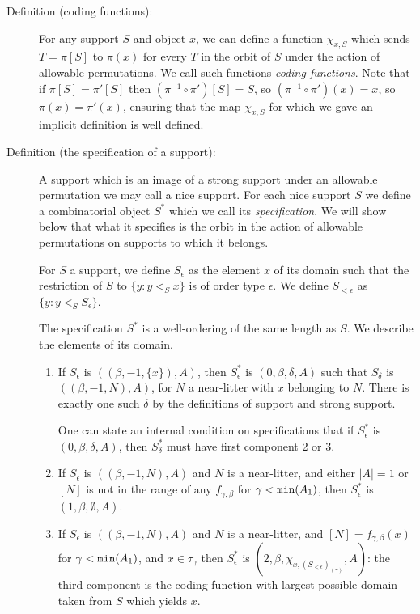 \documentclass[112pt]{article}
\begin{document}
\begin{description}

\item[Definition (coding functions):]  For any support $S$ and object $x$, we can define a function $\chi_{x,S}$ which sends $T=\pi[S]$ to $\pi(x)$ for every $T$ in the orbit of $S$ under
the action of allowable permutations.  We call such functions {\em coding functions\/}.  Note that if $\pi[S]=\pi'[S]$ then $(\pi^{-1}\circ \pi')[S]= S$, so 
$(\pi^{-1}\circ \pi')(x)= x$, so $\pi(x)=\pi'(x)$, ensuring that the map $\chi_{x,S}$ for which we gave an implicit definition is well defined.

\item[Definition (the specification of a support):]  A support which is an image of a strong support under an allowable permutation we may call a nice support.  For each nice support $S$ we define a combinatorial object $S^*$ which we call its {\em specification\/}.  We will show below that what it specifies is the orbit in the action of allowable permutations on supports to which it belongs.

For $S$ a support, we define $S_\epsilon$ as the element $x$ of its domain such that the restriction of $S$ to $\{y:y <_S x\}$ is of order type $\epsilon$.  We define
$S_{<\epsilon}$ as $\{y:y <_S S_\epsilon\}$.

The specification $S^*$ is a well-ordering of the same length as $S$.  We describe the elements of its domain.

\begin{enumerate}

\item  If $S_{\epsilon}$ is $((\beta,-1,\{x\}),A)$, then $S^*_\epsilon$ is $(0,\beta,\delta,A)$ such that $S_\delta$ is $((\beta,-1,N),A)$, for $N$ a near-litter with $x$ belonging to $N$.  There is exactly one such $\delta$ by the definitions of support and strong support.

One can state an internal condition on specifications that if $S^*_\epsilon$ is $(0,\beta,\delta,A)$, then $S^*_\delta$ must have first component 2 or 3.

\item  If $S_\epsilon$ is $((\beta,-1,N),A)$ and $N$ is a near-litter, and either $|A|=1$ or $[N]$ is not in the range of any $f_{\gamma,\beta}$ for $\gamma<{\tt min}(A_1)$, then $S^*_\epsilon$ is $(1,\beta,\emptyset,A)$.

\item  If $S_\epsilon$ is $((\beta,-1,N),A)$ and $N$ is a near-litter, and $[N]=f_{\gamma,\beta}(x)$ for $\gamma<{\tt min}(A_1)$, and $x\in \tau_\gamma$ then 
$S^*_\epsilon$ is $(2,\beta,\chi_{x,(S_{<\epsilon})_{(\gamma)}},A)$:  the third component is the coding function with largest possible domain taken from $S$ which yields $x$.


\end{enumerate}
\end{description}
\end{document}
